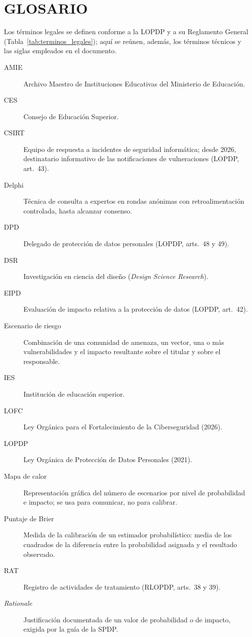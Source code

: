 \clearpage
\chapter*{GLOSARIO}

\noindent Los términos legales se definen conforme a la LOPDP y a su Reglamento General (Tabla~\ref{tab:terminos_legales}); aquí se reúnen, además, los términos técnicos y las siglas empleados en el documento.

\begin{description}
  \item[AMIE] Archivo Maestro de Instituciones Educativas del Ministerio de Educación.
  \item[CES] Consejo de Educación Superior.
  \item[CSIRT] Equipo de respuesta a incidentes de seguridad informática; desde 2026, destinatario informativo de las notificaciones de vulneraciones (LOPDP, art.~43).
  \item[Delphi] Técnica de consulta a expertos en rondas anónimas con retroalimentación controlada, hasta alcanzar consenso.
  \item[DPD] Delegado de protección de datos personales (LOPDP, arts.~48 y 49).
  \item[DSR] Investigación en ciencia del diseño (\textit{Design Science Research}).
  \item[EIPD] Evaluación de impacto relativa a la protección de datos (LOPDP, art.~42).
  \item[Escenario de riesgo] Combinación de una comunidad de amenaza, un vector, una o más vulnerabilidades y el impacto resultante sobre el titular y sobre el responsable.
  \item[IES] Institución de educación superior.
  \item[LOFC] Ley Orgánica para el Fortalecimiento de la Ciberseguridad (2026).
  \item[LOPDP] Ley Orgánica de Protección de Datos Personales (2021).
  \item[Mapa de calor] Representación gráfica del número de escenarios por nivel de probabilidad e impacto; se usa para comunicar, no para calibrar.
  \item[Puntaje de Brier] Medida de la calibración de un estimador probabilístico: media de los cuadrados de la diferencia entre la probabilidad asignada y el resultado observado.
  \item[RAT] Registro de actividades de tratamiento (RLOPDP, arts.~38 y 39).
  \item[\textit{Rationale}] Justificación documentada de un valor de probabilidad o de impacto, exigida por la guía de la SPDP.

\end{description}
